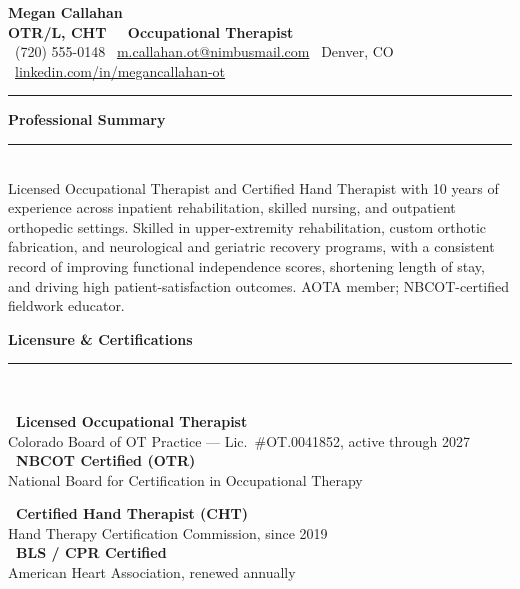 \documentclass[10pt]{article}
\newcommand{\cvsection}[1]{%
  \vspace{2pt}%
  {\color{otprimary}\large\bfseries #1}\\[-6.5pt]
  {\color{otprimary}\rule{\linewidth}{1.1pt}}\\[1pt]%
}
\begin{document}
\begin{center}
  {\fontsize{23}{25}\selectfont\bfseries\color{otdark} Megan Callahan}\\[2pt]
  {\color{otprimary}\bfseries\large OTR/L, CHT \ \textbar\ Occupational Therapist}\\[3pt]
  {\small\color{otgray}
    \faPhone\ (720) 555-0148 \quad
    \faEnvelope\ \href{mailto:m.callahan.ot@nimbusmail.com}{m.callahan.ot@nimbusmail.com} \quad
    \faMapMarker\ Denver, CO \quad
    \faLinkedin\ \href{https://linkedin.com/in/megancallahan-ot}{linkedin.com/in/megancallahan-ot}
  }
\end{center}

\vspace{2pt}
{\color{otprimary}\rule{\linewidth}{1.6pt}}

\cvsection{Professional Summary}
Licensed Occupational Therapist and Certified Hand Therapist with 10 years of experience across inpatient rehabilitation, skilled nursing, and outpatient orthopedic settings. Skilled in upper-extremity rehabilitation, custom orthotic fabrication, and neurological and geriatric recovery programs, with a consistent record of improving functional independence scores, shortening length of stay, and driving high patient-satisfaction outcomes. AOTA member; NBCOT-certified fieldwork educator.

\cvsection{Licensure \& Certifications}
\begin{minipage}[t]{0.49\linewidth}
  {\small
  \textbf{\textcolor{otaccent}{\faIdCard}\ Licensed Occupational Therapist} \\
  Colorado Board of OT Practice --- Lic.\ \#OT.0041852, active through 2027\\[1.5pt]
  \textbf{\textcolor{otaccent}{\faCertificate}\ NBCOT Certified (OTR)} \\
  National Board for Certification in Occupational Therapy
  }
\end{minipage}\hfill
\begin{minipage}[t]{0.49\linewidth}
  {\small
  \textbf{\textcolor{otaccent}{\faHandsHelping}\ Certified Hand Therapist (CHT)} \\
  Hand Therapy Certification Commission, since 2019\\[1.5pt]
  \textbf{\textcolor{otaccent}{\faHeartbeat}\ BLS / CPR Certified} \\
  American Heart Association, renewed annually
  }
\end{minipage}
\par
\end{document}
